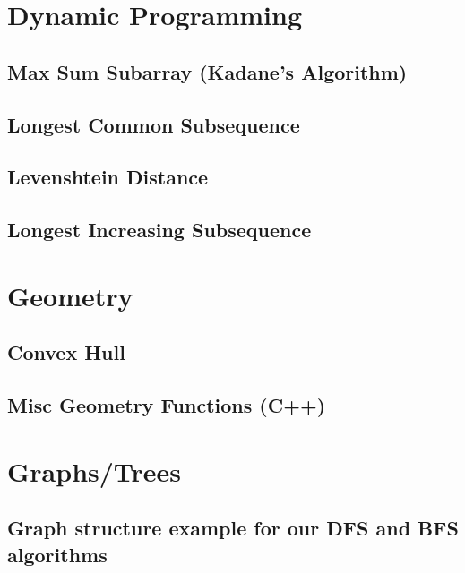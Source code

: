 \section{Dynamic Programming}
\subsection{Max Sum Subarray (Kadane's Algorithm)}
\raggedbottom
\hrulefill
\subsection{Longest Common Subsequence}
\raggedbottom
\hrulefill
\subsection{Levenshtein Distance}
\raggedbottom
\hrulefill
\subsection{Longest Increasing Subsequence}
\raggedbottom
\hrulefill

\section{Geometry}
\subsection{Convex Hull}
\raggedbottom
\hrulefill
\subsection{Misc Geometry Functions (C++)}
\raggedbottom
\hrulefill

\section{Graphs/Trees}
\subsection{Graph structure example for our DFS and BFS algorithms}
\raggedbottom
\hrulefill
